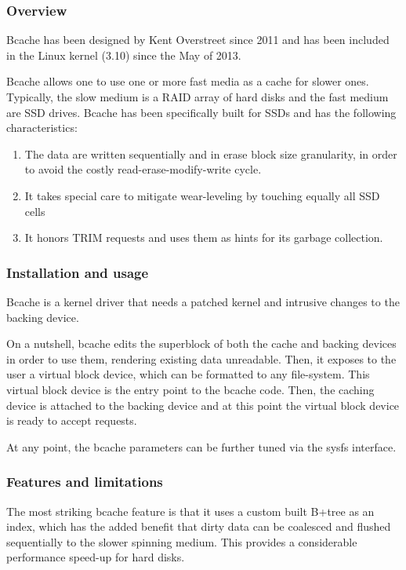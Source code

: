 \subsubsection{Overview}

Bcache has been designed by Kent Overstreet since 2011 and has been included in 
the Linux kernel (3.10) since the May of 2013.

Bcache allows one to use one or more fast media as a cache for slower ones.  
Typically, the slow medium is a RAID array of hard disks and the fast medium 
are SSD drives. Bcache has been specifically built for SSDs and has the 
following characteristics:

\begin{enumerate}
	\item The data are written sequentially and in erase block size 
		granularity, in order to avoid the costly 
		read-erase-modify-write cycle.
	\item It takes special care to mitigate wear-leveling by touching 
		equally all SSD cells
	\item It honors TRIM requests and uses them as hints for its garbage 
		collection.
\end{enumerate}

\subsubsection{Installation and usage}

Bcache is a kernel driver that needs a patched kernel and intrusive changes to 
the backing device.

On a nutshell, bcache edits the superblock of both the cache and backing 
devices in order to use them, rendering existing data unreadable.  Then, it 
exposes to the user a virtual block device, which can be formatted to any 
file-system. This virtual block device is the entry point to the bcache code.  
Then, the caching device is attached to the backing device and at this point 
the virtual block device is ready to accept requests.

At any point, the bcache parameters can be further tuned via the sysfs 
interface.  

\subsubsection{Features and limitations}

The most striking bcache feature is that it uses a custom built B+tree as an 
index, which has the added benefit that dirty data can be coalesced and flushed 
sequentially to the slower spinning medium. This provides a considerable 
performance speed-up for hard disks.

